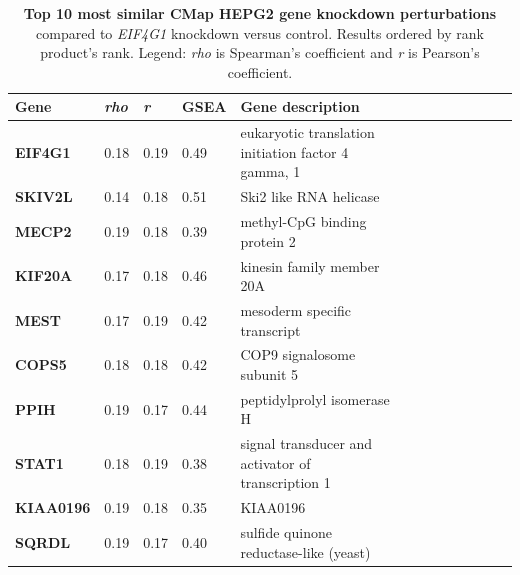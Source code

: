 \begin{table}[!h]
\centering
\footnotesize
\caption[Top 10 CMap HEPG2 gene knockdown perturbations]{\textbf{Top 10 most similar CMap HEPG2 gene knockdown perturbations} compared to \emph{EIF4G1} knockdown versus control. Results ordered by rank product's rank. Legend: \emph{rho} is Spearman's coefficient and \emph{r} is Pearson's coefficient.}
\label{tab:eif4g1-cmap-kd}
\begin{tabular}{lllllllllllll}
\toprule
\textbf{Gene}     & \textbf{\emph{rho}} & \textbf{\emph{r}} & \textbf{GSEA} & \textbf{Gene description}                           \\
\midrule
\textbf{EIF4G1}   & 0.18         & 0.19       & 0.49          & eukaryotic translation initiation factor 4 gamma, 1 \\
\textbf{SKIV2L}   & 0.14         & 0.18       & 0.51          & Ski2 like RNA helicase                              \\
\textbf{MECP2}    & 0.19         & 0.18       & 0.39          & methyl-CpG binding protein 2                        \\
\textbf{KIF20A}   & 0.17         & 0.18       & 0.46          & kinesin family member 20A                           \\
\textbf{MEST}     & 0.17         & 0.19       & 0.42          & mesoderm specific transcript                        \\
\textbf{COPS5}    & 0.18         & 0.18       & 0.42          & COP9 signalosome subunit 5                          \\
\textbf{PPIH}     & 0.19         & 0.17       & 0.44          & peptidylprolyl isomerase H                          \\
\textbf{STAT1}    & 0.18         & 0.19       & 0.38          & signal transducer and activator of transcription 1  \\
\textbf{KIAA0196} & 0.19         & 0.18       & 0.35          & KIAA0196                                            \\
\textbf{SQRDL}    & 0.19         & 0.17       & 0.40          & sulfide quinone reductase-like (yeast)             \\
\bottomrule
\end{tabular}
\end{table}

